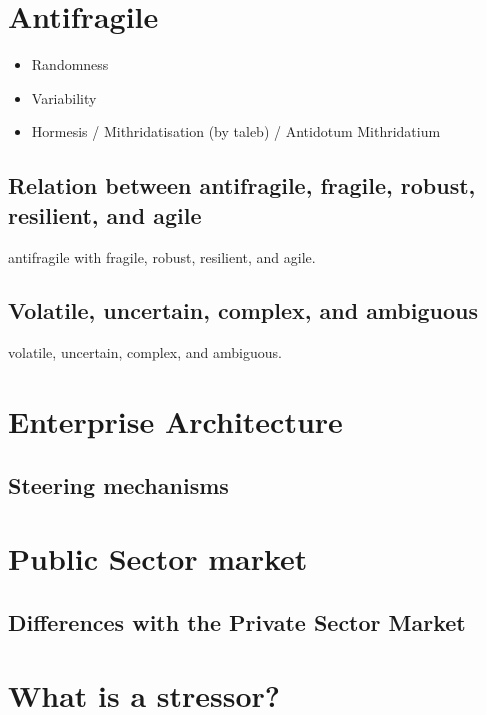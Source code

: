 \section{Antifragile}
\label{sec:tbantifragile}

\begin{itemize}
	\item{Randomness}
	\item{Variability}
	\item{Hormesis / Mithridatisation (by taleb) / Antidotum Mithridatium}
\end{itemize}

\subsection{Relation between antifragile, fragile, robust, resilient, and agile}
\label{sub:tbrelatedtoantifragile}

\gls{antifragile} with \gls{fragile}, \gls{robust}, \gls{resilient}, and \gls{agile}.

\subsection{Volatile, uncertain, complex, and ambiguous}
\label{seb:tbvuca}

\Gls{volatile}, \gls{uncertain}, \gls{complex}, and \gls{ambiguous}.

\section{Enterprise Architecture}
\label{sec:tbea}

\subsection{Steering mechanisms}
\label{sub:tbeasteering}

\section{Public Sector market}
\label{sec:tbpsmarket}

\subsection{Differences with the Private Sector Market}
\label{sub:tbdifferenceprivatesector}

\section{What is a stressor?}
\label{sec:stressor}

